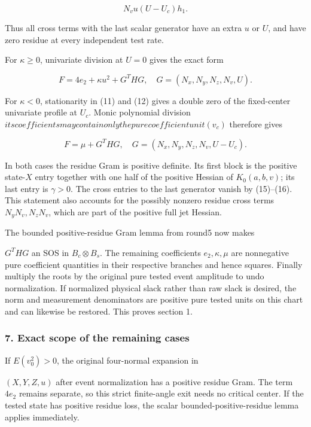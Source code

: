 \[
N_vu(U-U_c)h_1.
\tag{16}
\]

Thus all cross terms with the last scalar generator have an extra \(u\)
or \(U\), and have zero residue at every independent test rate.

For \(\kappa\ge0\), univariate division at \(U=0\) gives the exact form

\[
F=4e_2+\kappa u^2+G^T H G,
\quad G=(N_x,N_y,N_z,N_v,U).
\tag{17}
\]

For \(\kappa<0\), stationarity in (11) and (12) gives a double zero of
the fixed-center univariate profile at \(U_c\). Monic polynomial division
\(its coefficients may contain only the pure coefficient unit (v_c)\)
therefore gives

\[
F=\mu+G^THG,
\quad G=(N_x,N_y,N_z,N_v,U-U_c).
\tag{18}
\]

In both cases the residue Gram is positive definite. Its first block is
the positive state-\(X\) entry together with one half of the positive
Hessian of \(K_0(a,b,v)\); its last entry is \(\gamma>0\). The cross entries
to the last generator vanish by (15)--(16). This statement also accounts
for the possibly nonzero residue cross terms \(N_yN_v,N_zN_v\), which are
part of the positive full jet Hessian.

The bounded positive-residue Gram lemma from round5 now makes

\(G^THG\) an SOS in \(B_c\otimes B_s\). The remaining coefficients
\(e_2,\kappa,\mu\) are nonnegative pure coefficient quantities in their
respective branches and hence squares. Finally multiply the roots by the
original pure tested event amplitude to undo normalization. If normalized
physical slack rather than raw slack is desired, the norm and measurement
denominators are positive pure tested units on this chart and can likewise
be restored. This proves section 1.

\hypertarget{exact-scope-of-the-remaining-cases}{%
\subsubsection*{7. Exact scope of the remaining cases}\label{p4ec1a51262f9:exact-scope-of-the-remaining-cases}}

If \(E(v_0^2)>0\), the original four-normal expansion in

\((X,Y,Z,u)\) after event normalization has a positive residue Gram.
The term \(4e_2\) remains separate, so this strict finite-angle exit needs
no critical center. If the tested state has positive residue loss, the
scalar bounded-positive-residue lemma applies immediately.


